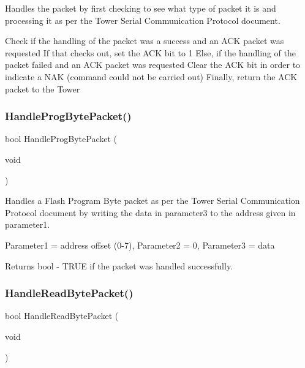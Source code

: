 Handles the packet by first checking to see what type of packet it is and processing it as per the Tower Serial Communication Protocol document. 

Check if the handling of the packet was a success and an A\+CK packet was requested If that checks out, set the A\+CK bit to 1 Else, if the handling of the packet failed and an A\+CK packet was requested Clear the A\+CK bit in order to indicate a N\+AK (command could not be carried out) Finally, return the A\+CK packet to the Tower\mbox{\label{group__main__module_ga87fcb3feeebe2013c2376a2635080be5}} 
\subsubsection{\texorpdfstring{Handle\+Prog\+Byte\+Packet()}{HandleProgBytePacket()}}
{\footnotesize\ttfamily bool Handle\+Prog\+Byte\+Packet (\begin{DoxyParamCaption}\item[{void}]{ }\end{DoxyParamCaption})}



Handles a Flash Program Byte packet as per the Tower Serial Communication Protocol document by writing the data in parameter3 to the address given in parameter1. 

Parameter1 = address offset (0-\/7), Parameter2 = 0, Parameter3 = data

\begin{DoxyReturn}{Returns}
bool -\/ T\+R\+UE if the packet was handled successfully. 
\end{DoxyReturn}
\mbox{\label{group__main__module_ga229934574bc13961e301d7c8ea4742cc}} 
\subsubsection{\texorpdfstring{Handle\+Read\+Byte\+Packet()}{HandleReadBytePacket()}}
{\footnotesize\ttfamily bool Handle\+Read\+Byte\+Packet (\begin{DoxyParamCaption}\item[{void}]{ }\end{DoxyParamCaption})}



